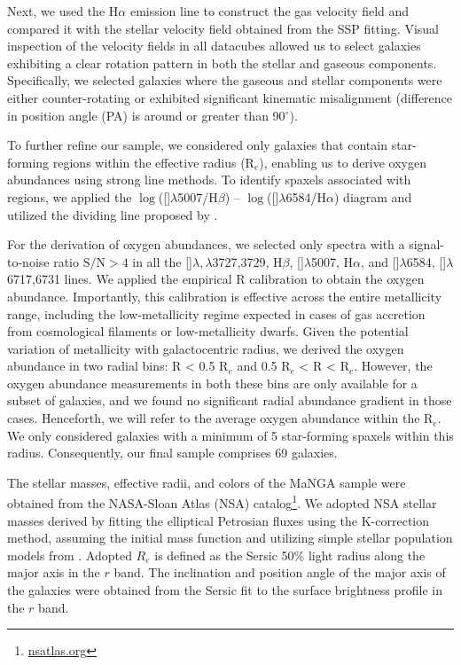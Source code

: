 \documentclass[12pt,preprint]{aa}
\begin{document}
Next, we used the H$\alpha$ emission line to construct the gas velocity field and compared it with the stellar velocity field obtained from the SSP fitting. Visual inspection of the velocity fields in all datacubes allowed us to select galaxies exhibiting a clear rotation pattern in both the stellar and gaseous components. Specifically, we selected galaxies where the gaseous and stellar components were either counter-rotating or exhibited significant kinematic misalignment (difference in position angle (PA) is around or greater than 90$^\circ$). 

To further refine our sample, we considered only galaxies that contain star-forming regions within the effective radius (R$_e$), enabling us to derive oxygen abundances using strong line methods. To identify spaxels associated with  regions, we applied the $\log$([]$\lambda$5007/H$\beta$) -- $\log$([]$\lambda$6584/H$\alpha$) diagram \citep{BPT} and utilized the dividing line proposed by \citet{Kauffmann2003}.

For the derivation of oxygen abundances, we selected only spectra with a signal-to-noise ratio $\text{S/N} > 4$ in all the []$\lambda,\lambda$3727,3729, H$\beta$, []$\lambda$5007, H$\alpha$, and []$\lambda$6584, []$\lambda$6717,6731 lines. We applied the empirical R calibration \citep{PilyuginGrebel2016} to obtain the oxygen abundance. Importantly, this calibration is effective across the entire metallicity range, including the low-metallicity regime expected in cases of gas accretion from cosmological filaments or low-metallicity dwarfs.
Given the potential variation of metallicity with galactocentric radius, we derived the oxygen abundance in two radial bins: R < 0.5 R$_e$ and 0.5 R$_e$ < R < R$_e$. However, the oxygen abundance measurements in both these bins are only available for a subset of galaxies, and we found no significant radial abundance gradient in those cases. Henceforth, we will refer to the average oxygen abundance within the R$_e$. We only considered galaxies with a minimum of 5 star-forming spaxels within this radius. Consequently, our final sample comprises 69 galaxies.

The stellar masses, effective radii, and colors of the MaNGA sample were obtained from the NASA-Sloan Atlas (NSA) catalog\footnote{\href{http://nsatlas.org}{nsatlas.org}}. We adopted NSA stellar masses derived by fitting the elliptical Petrosian fluxes using the K-correction method, assuming the \citet{Chabrier2003} initial mass function and utilizing simple stellar population models from \citet{BC03}. Adopted $R_e$ is defined as the Sersic 50\% light radius along the major axis in the $r$ band.
The inclination and position angle of the major axis of the galaxies were obtained from the Sersic fit to the surface brightness profile in the $r$ band. 
\end{document}
